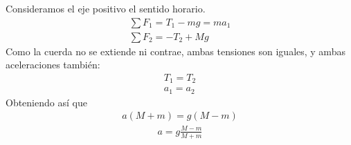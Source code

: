 \documentclass{article}
\begin{document}
Consideramos el eje positivo el sentido horario.
\begin{equation}
    \begin{split}
        \sum F_{1}=T_{1}-mg=ma_{1}\\
        \sum F_{2}=-T_{2}+Mg
    \end{split}
\end{equation}
Como la cuerda no se extiende ni contrae, ambas tensiones son iguales, y ambas aceleraciones también:
\begin{equation}
    \begin{split}
        T_{1}=T_{2}\\
        a_{1}=a_{2}
    \end{split}
\end{equation}
Obteniendo así que
\begin{equation}
    \begin{split}
        a(M+m)=g(M-m)
    \end{split}
\end{equation}
\begin{equation}
    \begin{split}
        a= g \frac{M-m}{M+m}
    \end{split}
\end{equation}
\end{document}
